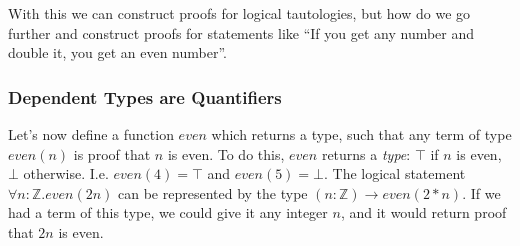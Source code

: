 \documentclass[12pt,twoside]{report}
\begin{document}

With this we can construct proofs for logical tautologies, but how do we go further and construct proofs for statements like ``If you get any number and double it, you get an even number''.

\subsubsection{Dependent Types are Quantifiers}
Let's now define a function $even$ which returns a type, such that any term of type $even(n)$ is proof that $n$ is even. To do this, $even$ returns a \textit{type}: $\top$ if $n$ is even, $\bot$ otherwise. I.e. $even(4) = \top$ and $even(5) = \bot$. The logical statement $\forall n : \mathbb{Z}. even(2n)$ can be represented by the type $(n: \mathbb{Z}) \rightarrow even(2 * n)$. If we had a term of this type, we could give it any integer $n$, and it would return proof that $2n$ is even.
\end{document}
